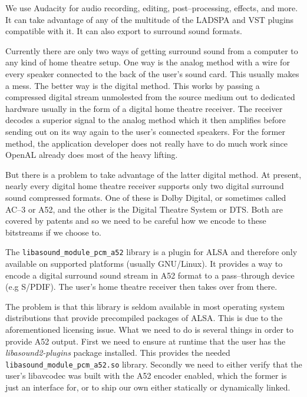 

\startitemize[4]

We use Audacity for audio recording, editing, post--processing, effects, and more. It can take advantage of any of the multitude of the LADSPA and VST plugins compatible with it. It can also export to surround sound formats.


Currently there are only two ways of getting surround sound from a computer to any kind of home theatre setup. One way is the analog method with a wire for every speaker connected to the back of the user's sound card. This usually makes a mess. The better way is the digital method. This works by passing a compressed digital stream unmolested from the source medium out to dedicated hardware usually in the form of a digital home theatre receiver. The receiver decodes a superior signal to the analog method which it then amplifies before sending out on its way again to the user's connected speakers. For the former method, the application developer does not really have to do much work since OpenAL already does most of the heavy lifting.

But there is a problem to take advantage of the latter digital method. At present, nearly every digital home theatre receiver supports only two digital surround sound compressed formats. One of these is Dolby Digital, or sometimes called AC--3 or A52, and the other is the Digital Theatre System or DTS. Both are covered by patents and so we need to be careful how we encode to these bitstreams if we choose to. 

The {\tt libasound_module_pcm_a52} library is a plugin for ALSA and therefore only available on supported platforms (usually GNU/Linux). It provides a way to encode a digital surround sound stream in A52 format to a pass--through device (e.g S/PDIF). The user's home theatre receiver then takes over from there. 

The problem is that this library is seldom available in most operating system distributions that provide precompiled packages of ALSA. This is due to the aforementioned licensing issue. What we need to do is several things in order to provide A52 output. First we need to ensure at runtime that the user has the {\it libasound2-plugins} package installed. This provides the needed {\tt libasound_module_pcm_a52.so} library. Secondly we need to either verify that the user's libavcodec was built with the A52 encoder enabled, which the former is just an interface for, or to ship our own either statically or dynamically linked. 

